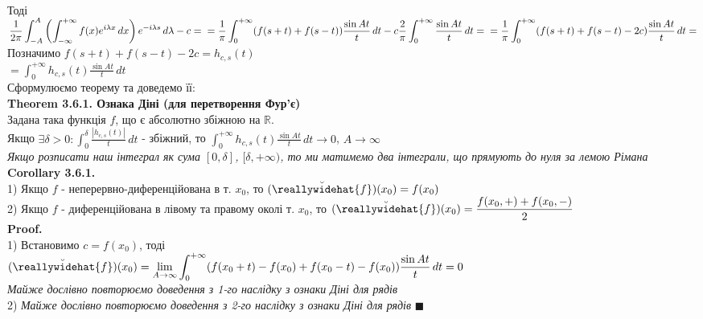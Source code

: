 \documentclass{math_library}
\begin{document}
\\
Тоді\\
$\displaystyle \frac{1}{2\pi} \displaystyle \int_{-A}^{A} \left(\int_{-\infty}^{+\infty} f(x) e^{i\lambda x}\,dx \right) e^{-i \lambda s}\,d\lambda - c = \\ 
= \frac{1}{\pi} \int_{0}^{+\infty} (f(s+t)+f(s-t)) \frac{ \sin At}{t} \,dt - c \frac{2}{\pi} \int_0^{+\infty} \frac{\sin At}{t}\,dt = \\ 
= \frac{1}{\pi} \int_{0}^{+\infty} (f(s+t)+f(s-t)-2c) \frac{\sin At}{t}\,dt =$\\
Позначимо $f(s+t)+f(s-t)-2c=h_{c,s}(t)$\\
$= \displaystyle \int_{0}^{+\infty} h_{c,s}(t) \frac{\sin At}{t}\,dt$\\
Сформулюємо теорему та доведемо її:
\bigskip \\
\textbf{Theorem 3.6.1. Ознака Діні (для перетворення Фур'є)}\\
Задана така функція $f$, що є абсолютно збіжною на $\mathbb{R}$.\\
Якщо $\exists \delta>0: \displaystyle \int_{0}^{\delta} \frac{|h_{c,s}(t)|}{t}\,dt$ - збіжний, то $\displaystyle \int_{0}^{+\infty} h_{c,s}(t) \frac{\sin At}{t}\,dt \to 0$, $A \to \infty$\\
\textit{Якщо розписати наш інтеграл як сума $[0,\delta]$, $[\delta, +\infty)$, то ми матимемо два інтеграли, що прямують до нуля за лемою Рімана}
\bigskip \\
\textbf{Corollary 3.6.1.}\\
1) Якщо $f$ - неперервно-диференційована в т. $x_0$, то $\breve{(\reallywidehat{f})}(x_0) = f(x_0)$
\bigskip \\
2) Якщо $f$ - диференційована в лівому та правому околі т. $x_0$, то $\displaystyle \breve{(\reallywidehat{f})}(x_0) = \frac{f(x_0,+)+f(x_0,-)}{2}$\\
\textbf{Proof.}\\
1) Встановимо $c = f(x_0)$, тоді\\
$\displaystyle \breve{(\reallywidehat{f})}(x_0) = \lim_{A \to \infty} \int_{0}^{+\infty} (f(x_0+t)-f(x_0)+f(x_0-t)-f(x_0)) \frac{\sin At}{t}\,dt = 0$\\
\textit{Майже дослівно повторюємо доведення з 1-го наслідку з ознаки Діні для рядів}
\bigskip \\
2) \textit{Майже дослівно повторюємо доведення з 2-го наслідку з ознаки Діні для рядів} $\blacksquare$
\\
\newpage


\end{document}
